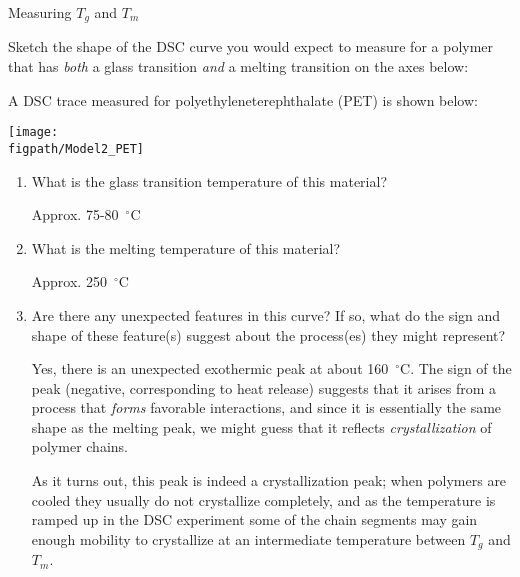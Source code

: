 \begin{activity}{Measuring $T_g$ and $T_m$}
\begin{ctqs}
	\question Sketch the shape of the DSC curve you would expect to measure for a polymer that has \emph{both} a glass transition \emph{and} a melting transition on the axes below:
	
		\vspace{6pt}
		\begin{solution}[2.5in]\end{solution}
	
	\clearpage
	\question A DSC trace measured for polyethyleneterephthalate (PET) is shown below:
	
		\vspace{6pt}
		\centerline{\texttt{[image: \\figpath/Model2\_PET]}}
	
		\begin{enumerate}
			\item What is the glass transition temperature of this material?
			
				\begin{solution}[0.5in]
					Approx. 75-80~$^\circ$C
				\end{solution}
			
			\item What is the melting temperature of this material?
			
				\begin{solution}[0.5in]
					Approx. 250~$^\circ$C
				\end{solution}
			
			\item Are there any unexpected features in this curve? If so, what do the sign and shape of these feature(s) suggest about the process(es) they might represent?
			
				\begin{solution}[2in]
					Yes, there is an unexpected exothermic peak at about 160~$^\circ$C.  The sign of the peak (negative, corresponding to heat release) suggests that it arises from a process that \emph{forms} favorable interactions, and since it is essentially the same shape as the melting peak, we might guess that it reflects \emph{crystallization} of polymer chains.
					
					As it turns out, this peak is indeed a crystallization peak; when polymers are cooled they usually do not crystallize completely, and as the temperature is ramped up in the DSC experiment some of the chain segments may gain enough mobility to crystallize at an intermediate temperature between $T_g$ and $T_m$.
				\end{solution}
		\end{enumerate}
	

\end{ctqs}
\end{activity}
